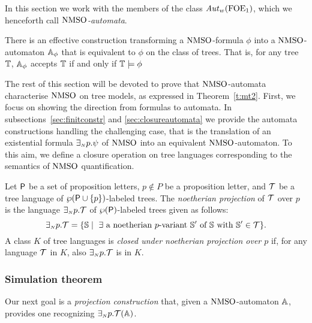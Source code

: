 In this section we work with the members of the class $\mathit{Aut}_{w}(\mathrm{FOE}_1)$, which we henceforth call \emph{$\mathrm{NMSO}$-automata}.


\begin{theorem}
\label{t:nmsoauto}
There is an effective construction transforming a $\mathrm{NMSO}$-formula $\phi$
into a $\mathrm{NMSO}$-automaton $\mathbb{A}_{\phi}$ that is equivalent
to $\phi$ on the class of trees.
That is, for any tree $\mathbb{T}$, $\mathbb{A}_{\phi}$ accepts $\mathbb{T}$ if and only if $\mathbb{T} \models {\phi}$
\end{theorem}

The rest of this section will be devoted to prove that $\mathrm{NMSO}$-automata
characterise $\mathrm{NMSO}$ on tree models, as expressed in Theorem~\ref{t:mt2}.
First, we focus on showing the direction from formulas to automata.
In subsections~\ref{sec:finitconstr} and \ref{sec:closureautomata} we provide
the automata constructions handling the challenging case, that is the
translation of an existential formula $\exists_{{\scriptscriptstyle N}} p.\psi$ of $\mathrm{NMSO}$ into an
equivalent $\mathrm{NMSO}$-automaton.
To this aim, we define a closure operation on tree languages corresponding
to the semantics of $\mathrm{NMSO}$ quantification.

\begin{definition}\label{def:tree_finproj}
Let $\mathsf{P}$ be a set of proposition letters, $p \not\in P$ be a proposition letter, and $\mathcal{T}$ be a tree language of $\wp (\mathsf{P}\cup\{p\})$-labeled
trees.
The \emph{noetherian projection} of $\mathcal{T}$ over $p$ is the language
$\exists_{{\scriptscriptstyle N}} p.\mathcal{T}$ of $\wp (\mathsf{P})$-labeled trees %
given as follows:
%
$$
\noetexists p.\trees = \{\model \mid \text{ $\exists$ a noetherian $p$-variant } \model' \text{ of } \model \text{ with } \model' \in \trees\}.
$$
%
A class $K$ of tree languages is \emph{closed under noetherian projection
over $p$} if, for any language $\mathcal{T}$ in $K$, also ${\exists_{{\scriptscriptstyle N}} p}.\mathcal{T}$ is in $K$.
\end{definition} 

\subsubsection{Simulation theorem}


Our next goal is a \emph{projection construction} that, given
a $\mathrm{NMSO}$-automaton $\mathbb{A}$, provides one recognizing ${\exists_{{\scriptscriptstyle N}} p}.\mathcal{T}(\mathbb{A})$.


